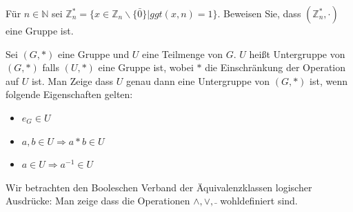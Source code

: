 \documentclass[10pt, a4paper]{exam}
\begin{document}
\begin{questions}

    \question Für $n\in\mathbb{N}$ sei $\mathbb{Z}_n^{\ast}=\{x\in\mathbb{Z}_n\backslash\{\bar{0}\}| ggt(x,n) = 1\}$. Beweisen Sie, dass $(\mathbb{Z}_n^{\ast},\cdot )$ eine Gruppe ist.
    \begin{solution}
    \end{solution}

    \question Sei $(G,\ast)$ eine Gruppe und $U$ eine Teilmenge von $G$. $U$ heißt Untergruppe von $(G,\ast)$ falls $(U,\ast)$ eine Gruppe ist, wobei $\ast$ die Einschränkung der Operation auf $U$ ist. Man Zeige dass $U$ genau dann eine Untergruppe von $(G,\ast)$ ist, wenn folgende Eigenschaften gelten:
    \begin{itemize}
        \item $e_G\in U$
              \begin{solution}
              \end{solution}
        \item $a,b\in U \Rightarrow a \ast b \in U$
              \begin{solution}
              \end{solution}
        \item $a\in U\Rightarrow a^{-1}\in U$
              \begin{solution}
              \end{solution}
    \end{itemize}

    \question Wir betrachten den Booleschen Verband der Äquivalenzklassen logischer Ausdrücke: Man zeige dass die Operationen $\wedge, \vee,\bar{}$ wohldefiniert sind.
    \begin{solution}
    \end{solution}


\end{questions}
\end{document}
